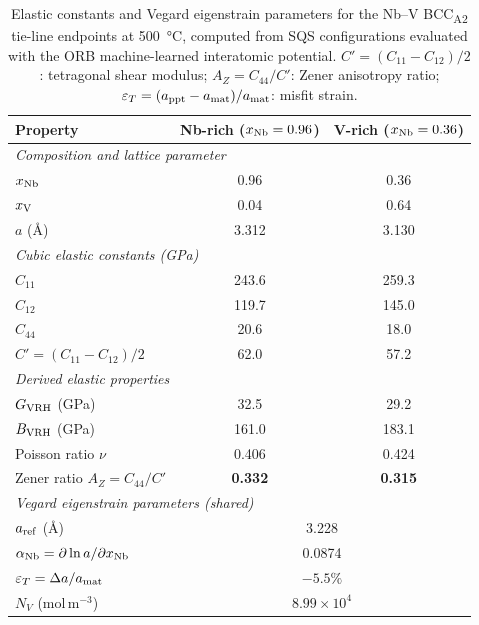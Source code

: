 \begin{table}[!h]
    \centering
    \caption{%
        Elastic constants and Vegard eigenstrain parameters for the Nb--V
        BCC\textsubscript{A2} tie-line endpoints at \SI{500}{\celsius},
        computed from SQS configurations evaluated with the ORB
        machine-learned interatomic potential.
        $C' = (C_{11}-C_{12})/2$: tetragonal shear modulus;
        $A_Z = C_{44}/C'$: Zener anisotropy ratio;
        $\varepsilon_T = (a_{\rm ppt} - a_{\rm mat})/a_{\rm mat}$: misfit strain.
    }
    \label{tab:binary_elastic}
    \renewcommand{\arraystretch}{0.8}
    \setlength{\tabcolsep}{5pt}
    \begin{tabular}{lcc}
        \toprule
        Property & Nb-rich ($x_{\rm Nb}=0.96$) & V-rich ($x_{\rm Nb}=0.36$) \\
        \midrule
        \multicolumn{3}{l}{\textit{Composition and lattice parameter}} \\
        $x_{\rm Nb}$ & 0.96 & 0.36 \\
        $x_{\rm V}$  & 0.04 & 0.64 \\
        $a$ (\AA)    & 3.312 & 3.130 \\
        \midrule
        \multicolumn{3}{l}{\textit{Cubic elastic constants (GPa)}} \\
        $C_{11}$ & 243.6 & 259.3 \\
        $C_{12}$ & 119.7 & 145.0 \\
        $C_{44}$ &  20.6 &  18.0 \\
        $C' = (C_{11}-C_{12})/2$ & 62.0 & 57.2 \\
        \midrule
        \multicolumn{3}{l}{\textit{Derived elastic properties}} \\
        $G_{\rm VRH}$ (GPa) & 32.5 & 29.2 \\
        $B_{\rm VRH}$ (GPa) & 161.0 & 183.1 \\
        Poisson ratio $\nu$ & 0.406 & 0.424 \\
        Zener ratio $A_Z = C_{44}/C'$ & \textbf{0.332} & \textbf{0.315} \\
        \midrule
        \multicolumn{3}{l}{\textit{Vegard eigenstrain parameters (shared)}} \\
        $a_{\rm ref}$ (\AA) & \multicolumn{2}{c}{3.228} \\
        $\alpha_{\rm Nb} = \partial\ln a/\partial x_{\rm Nb}$ & \multicolumn{2}{c}{0.0874} \\
        $\varepsilon_T = \Delta a / a_{\rm mat}$ & \multicolumn{2}{c}{$-5.5\%$} \\
        $N_V$ (mol\,m$^{-3}$) & \multicolumn{2}{c}{$8.99\times10^{4}$} \\
        \bottomrule
    \end{tabular}
\end{table}

